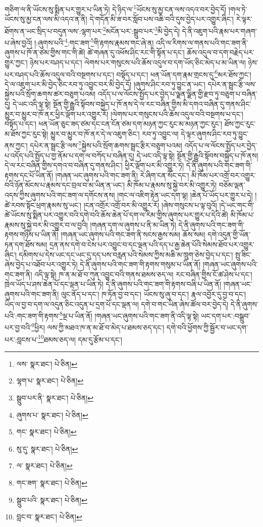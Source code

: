 གཅིག་ལ་ནི་ཡོངས་སུ་སྨིན་པར་གྱུར་པ་ཡིན་ཏེ། དེ་ཉིད་ལ་\footnote{ལས་  སྣར་ཐང་།  པེ་ཅིན། }ཡོངས་སུ་མྱ་ངན་ལས་འདའ་བར་བྱེད་དོ། །གལ་ཏེ་ཡོངས་སུ་མྱ་ངན་ལས་མི་འདའ་ན་ནི། དེ་གདོན་མི་ཟ་བར་སློབ་པས་འཆི་བའི་དུས་བྱེད་པར་འགྱུར་ཞིང་། རེ་ལྟར་ཐོགས་ན་ཡང་སྲིད་པ་བདུན་ལས་:ལྷག་པར་\footnote{ལྷག་པ་  སྣར་ཐང་།  པེ་ཅིན། }མངོན་པར་:སྒྲུབ་པར་\footnote{སྒྲུབ་པར་ནི་  སྣར་ཐང་།  པེ་ཅིན། }མི་བྱེད་དེ། དེ་ནི་འཇུག་པའི་རྣམ་པར་གཞག་པ་ཞེས་བྱའོ། །:ཞུགས་པའི་\footnote{ཞུགས་པ་  སྣར་ཐང་།  པེ་ཅིན། }:གང་ཟག་\footnote{གང་  སྣར་ཐང་།  པེ་ཅིན། }གི་རྟགས་རྣམས་གང་ཞེ་ན། འདི་ལ་རིགས་ལ་གནས་པའི་གང་ཟག་ནི་ཞུགས་པ་ཁོ་ན་ཙམ་གྱིས་གང་གི་ཚེ། ཚེ་གཞན་དུ་འཕོས་ཤིང་རང་གི་སྟོན་པ་དང་། ཆོས་འདུལ་བ་དག་བརྗེད་པར་གྱུར་ཀྱང་། ཉེས་པར་བཤད་པ་དང་། ལེགས་པར་གསུངས་པའི་ཆོས་འདུལ་བ་དག་ཡོད་ཅིང་མེད་པ་མ་ཡིན་ལ། ཉེས་པར་བཤད་པའི་ཆོས་འདུལ་བའི་བསྔགས་པ་དང་། བསྟོད་པ་དང་། ཕན་ཡོན་དག་རྣམ་གྲངས་དུ་\footnote{སུ་དུ་  སྣར་ཐང་།  པེ་ཅིན། }མར་ཐོས་ཀྱང་། དེ་ལ་འཇུག་པར་མི་བྱེད་ཅིང་རབ་ཏུ་འབྱུང་བར་མི་བྱེད་དོ། །ཞུགས་ཤིང་རབ་ཏུ་བྱུང་ན་ཡང་། དཔེར་ན་སྦྲང་རྩི་ལས་སྐྱེས་པའི་སྲོག་ཆགས་ཚར་བཅུག་པའམ། འདོད་པ་ལ་ལོངས་སྤྱོད་པར་བྱེད་པ་ལྗན་ལྗིན་གྱི་རྫབ་ཏུ་བཅུག་པ་བཞིན་དུ། དེ་ཡང་འདི་ལྟ་སྟེ། སྔོན་གྱི་རྒྱུའི་སྟོབས་བསྐྱེད་པ་ཁོ་ནས་དེ་ལ་རང་བཞིན་གྱིས་མི་དགའ་བཞིན་དུ་གནས་ཤིང་མྱུར་བ་མྱུར་བ་ཁོ་ནར་ཕྱིར་ལྡོག་པར་འགྱུར་རོ། །ལེགས་པར་གསུངས་པའི་ཆོས་འདུལ་བའི་བསྔགས་པ་དང་། བསྟོད་པ་དང་། ཕན་ཡོན་ཅུང་ཟད་ཙམ་དང་ངན་ངོན་ཙམ་དག་མཉན་ཀྱང་རུང་མ་མཉན་ཀྱང་རུང་། ཐོས་ཀྱང་རུང་མ་ཐོས་ཀྱང་རུང་སྟེ། མྱུར་བ་མྱུར་བ་ཁོ་ནར་དེ་ལ་འཇུག་ཅིང་། རབ་ཏུ་འབྱུང་ལ། དེ་ལྟར་ཞུགས་ཤིང་རབ་ཏུ་བྱུང་ནས་ཀྱང་། དཔེར་ན་སྦྲང་རྩི་ལས་\footnote{ལ་  སྣར་ཐང་།  པེ་ཅིན། }སྐྱེས་པའི་སྲོག་ཆགས་སྦྲང་རྩིར་བཅུག་པའམ། འདོད་པ་ལ་ལོངས་སྤྱོད་པར་བྱེད་པ་འདོད་པའི་སྤྱོད་པ་གྱ་ནོམ་པ་དག་ལ་བཀོད་པ་བཞིན་དུ། དེ་ཡང་འདི་ལྟ་སྟེ། སྔོན་གྱི་རྒྱུའི་སྟོབས་བསྐྱེད་པ་ཁོ་ནས། དེ་ལ་རང་བཞིན་གྱིས་དགའ་བ་བཞིན་དུ་གནས་ཤིང་། ཕྱིར་ལྡོག་པར་མི་འགྱུར་ཏེ། དེ་ནི་ཞུགས་པའི་གང་ཟག་གི་རྟགས་དང་པོ་ཡིན་ནོ། །གཞན་ཡང་ཞུགས་པའི་གང་ཟག་ནི། རེ་ཞིག་ངན་སོང་དང་། མི་ཁོམ་པར་འགྲོ་བར་འགྱུར་བའི་ཉོན་མོངས་པ་རྣམས་དང་བྲལ་བ་མ་ཡིན་ན་ཡང་། མི་ཁོམ་པ་རྣམས་སུ་སྐྱེ་བར་མི་འགྱུར་ཏེ། བཅོམ་ལྡན་འདས་ཀྱིས་ཞུགས་པའི་གང་ཟག་ལ་དགོངས་ནས། །གང་ལ་འཇིག་རྟེན་ཡང་དག་ལྟ། །ཆེན་པོ་ཡོད་པར་གྱུར་པ་དེ། །ཚེ་རབས་སྟོང་ཕྲག་རྣམས་སུ་ཡང་། །ངན་འགྲོར་འགྲོ་བར་མི་འགྱུར་རོ། །ཞེས་གསུངས་པ་ལྟ་བུའོ། །དེ་ཡང་གང་གི་ཚེ་ཡོངས་སུ་སྨིན་པར་འགྱུར་བའི་དགེ་བའི་ཆོས་ཆེན་པོ་དག་ལ་རིམ་གྱིས་ཞུགས་པར་གྱུར་པ་དེའི་ཚེ། མི་ཁོམ་པ་རྣམས་སུ་སྐྱེ་བར་མི་འགྱུར་བ་ལ་བྱའི། །གཞན་དག་ལ་ཞུགས་པ་ནི་མ་ཡིན་ཏེ། དེ་ནི་ཞུགས་པའི་གང་ཟག་གི་རྟགས་གཉིས་པ་ཡིན་ནོ། །གཞན་ཡང་ཞུགས་པའི་གང་ཟག་ནི་སངས་རྒྱས་སམ། ཆོས་སམ། དགེ་འདུན་གྱི་ཡོན་ཏན་དག་ཐོས་སམ། དྲན་ནས་དགེ་བ་ངེས་པར་འབྱུང་བ་དང་ལྡན་པའི་དད་པ་རྒྱ་ཆེན་པོའི་སེམས་ཐོབ་པར་འགྱུར་ཞིང་། དམིགས་པ་དེས་ཡང་དང་ཡང་དུ་དད་པས་བརླན་པའི་སེམས་ཀྱིས་མཆི་མ་ཁྲུག་ཅེས་བྱེད་པ་དང་། སྤུ་ཟིང་ཞེས་བྱེད་པ་འཐོབ་པར་འགྱུར་ཏེ། དེ་ནི་ཞུགས་པའི་གང་ཟག་གི་རྟགས་གསུམ་པ་ཡིན་ནོ། །གཞན་ཡང་ཞུགས་པའི་གང་ཟག་ནི། འདི་ལྟ་སྟེ། ཁ་ན་མ་ཐོ་བ་ཀུན་འབྱུང་བའི་གནས་ཐམས་ཅད་ལ། རང་བཞིན་གྱིས་ངོ་ཚ་ཤེས་པ་དང་། ཁྲེལ་ཡོད་པ་ཤས་ཆེན་པོ་དང་ལྡན་པ་ཡིན་ཏེ། དེ་ནི་ཞུགས་པའི་གང་ཟག་གི་རྟགས་བཞི་པ་ཡིན་ནོ། །གཞན་ཡང་ཞུགས་པའི་གང་ཟག་ནི། ལུང་ནོད་པ་དང་། ཁ་ཏོན་བྱ་བ་དང་། ཡོངས་སུ་ཞུ་བ་དང་། རྣལ་འབྱོར་དུ་བྱ་བ་དང་། ཡིད་ལ་བྱ་བ་དག་ལ་འདུན་ཅིང་འདུན་པ་དྲག་པོ་དང་ལྡན་ལ། དགེ་བ་གང་ཡིན་ཞེས་ཚོལ་བར་བྱེད་དེ། དེ་ནི་ཞུགས་པའི་:གང་ཟག་གི་རྟགས་\footnote{གང་ཟག་  སྣར་ཐང་།  པེ་ཅིན། }ལྔ་པ་ཡིན་ནོ། །གཞན་ཡང་ཞུགས་པའི་གང་ཟག་ནི་འདི་ལྟ་སྟེ། ཡང་དག་པར་:བསྒྲུབ་པར་བྱ་བའི་\footnote{སྒྲུབ་པའི་  སྣར་ཐང་།  པེ་ཅིན། }ཕྱིར། ལས་ཀྱི་མཐའ་ཁ་ན་མ་ཐོ་བ་མེད་པ་ཐམས་ཅད་དང་། དགེ་བའི་ཕྱོགས་ཀྱི་སྦྱོར་བ་ཡང་དག་པར་:བླངས་པ་\footnote{བླང་བ་  སྣར་ཐང་།  པེ་ཅིན། }ཐམས་ཅད་ལ། དམ་དུ་རྩོམ་པ་དང་། 